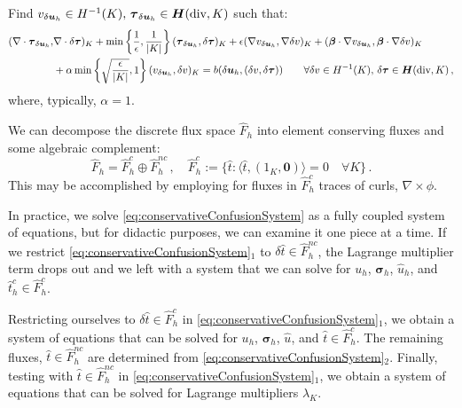\documentclass[letterpaper]{article}
\def\btau{\boldsymbol\tau}
\def\bsigma{\boldsymbol\sigma}
\def\bbeta{\boldsymbol\beta}
\newcommand{\bs}[1]{\boldsymbol{#1}}
\newcommand{\bfH}{\mbox{\boldmath $H$}}
\newcommand{\HdivK}{\bfH(\text{div},K)}
\newcommand{\HOneK}{H^{-1}(K)}
\newcommand{\vdeltau}{v_{\delta\bs u_h}}
\newcommand{\taudeltau}{\btau_{\delta\bs u_h}}
\begin{document}
Find $\vdeltau\in\HOneK,\,\taudeltau\in\HdivK$ such that:
\begin{align}
(\nabla\cdot\taudeltau,&\nabla\cdot\delta\btau)_K
+\min\left\{\frac{1}{\epsilon},\frac{1}{|K|}\right\}(\taudeltau,\delta\btau)_K
+\epsilon(\nabla\vdeltau,\nabla \delta v)_K
+(\bbeta\cdot\nabla\vdeltau,\bbeta\cdot\nabla \delta v)_K\nonumber\\
&+\alpha\min\left\{\sqrt{\frac{\epsilon}{|K|}},1\right\}(\vdeltau,\delta v)_K
=b(\delta\bs u_h,(\delta v,\delta\btau))
\quad\quad\forall\delta v\in\HOneK,\,\delta\btau\in\HdivK\,,
\label{eq:localSolve}
\end{align}
where, typically, $\alpha=1$.

We can decompose the discrete flux space $\hat F_h$ into element conserving
fluxes and some algebraic complement:
\begin{equation}
\hat F_h=\hat F_h^c\oplus\hat F_h^{nc}\,,\quad\hat 
F_h^{c}:=\{\hat t:\langle\hat t,(1_K,\bs0)\rangle=0\quad\forall K\}\,.
\label{eq:decomposition}
\end{equation}
This may be accomplished by employing for fluxes in $\hat F_h^{c}$ traces of
curls, $\nabla\times\phi$. 

In practice, we solve \eqref{eq:conservativeConfusionSystem} as a fully 
coupled system of equations, but for didactic purposes, we can examine it 
one piece at a time. If we restrict \eqref{eq:conservativeConfusionSystem}$_1$
to $\delta\hat t\in\hat F_h^{nc}$, the Lagrange multiplier term drops out and we 
left with a system that we can solve for $u_h$, $\bsigma_h$, $\hat u_h$, and 
$\hat t_h^c\in\hat F^c_h$.

Restricting ourselves to $\delta\hat t\in\hat
F_h^{c}$ in \eqref{eq:conservativeConfusionSystem}$_1$, we obtain a system  of
equations that can be solved for $u_h$, $\bsigma_h$, $\hat u$, and $\hat
t\in\hat F_h^c$. The remaining fluxes, $\hat t\in\hat F_h^{nc}$ are determined
from \eqref{eq:conservativeConfusionSystem}$_2$. Finally, testing with $\hat
t\in\hat F_h^{nc}$ in \eqref{eq:conservativeConfusionSystem}$_1$, we obtain a
system of equations that can be solved for Lagrange multipliers $\lambda_K$.
\end{document}
